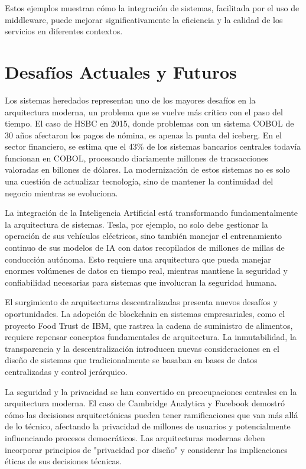 Estos ejemplos muestran cómo la integración de sistemas, facilitada por el uso de middleware, puede mejorar significativamente la eficiencia y la calidad de los servicios en diferentes contextos.

\section{Desafíos Actuales y Futuros}

Los sistemas heredados representan uno de los mayores desafíos en la arquitectura moderna, un problema que se vuelve más crítico con el paso del tiempo. El caso de HSBC en 2015, donde problemas con un sistema COBOL de 30 años afectaron los pagos de nómina, es apenas la punta del iceberg. En el sector financiero, se estima que el 43\% de los sistemas bancarios centrales todavía funcionan en COBOL, procesando diariamente millones de transacciones valoradas en billones de dólares. La modernización de estos sistemas no es solo una cuestión de actualizar tecnología, sino de mantener la continuidad del negocio mientras se evoluciona.

La integración de la Inteligencia Artificial está transformando fundamentalmente la arquitectura de sistemas. Tesla, por ejemplo, no solo debe gestionar la operación de sus vehículos eléctricos, sino también manejar el entrenamiento continuo de sus modelos de IA con datos recopilados de millones de millas de conducción autónoma. Esto requiere una arquitectura que pueda manejar enormes volúmenes de datos en tiempo real, mientras mantiene la seguridad y confiabilidad necesarias para sistemas que involucran la seguridad humana.

El surgimiento de arquitecturas descentralizadas presenta nuevos desafíos y oportunidades. La adopción de blockchain en sistemas empresariales, como el proyecto Food Trust de IBM, que rastrea la cadena de suministro de alimentos, requiere repensar conceptos fundamentales de arquitectura. La inmutabilidad, la transparencia y la descentralización introducen nuevas consideraciones en el diseño de sistemas que tradicionalmente se basaban en bases de datos centralizadas y control jerárquico.

La seguridad y la privacidad se han convertido en preocupaciones centrales en la arquitectura moderna. El caso de Cambridge Analytica y Facebook demostró cómo las decisiones arquitectónicas pueden tener ramificaciones que van más allá de lo técnico, afectando la privacidad de millones de usuarios y potencialmente influenciando procesos democráticos. Las arquitecturas modernas deben incorporar principios de "privacidad por diseño" y considerar las implicaciones éticas de sus decisiones técnicas.

